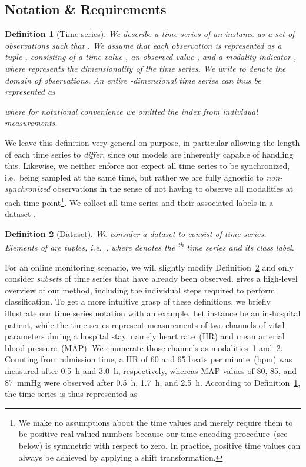 \documentclass{article}
\renewcommand{\th}{\textsuperscript{\textup{th}}\xspace}
\newtheorem{definition}{Definition}
\begin{document}
\subsection{Notation \& Requirements}


\begin{definition}[Time series]
  We describe a time series of an instance  as a set 
  of  observations
   such that .
We assume that each observation  is represented as a tuple
  , consisting of a time value ,
  an observed value ,
  and a modality indicator , where  represents the dimensionality
  of the time series.
We write 
  to denote the domain of observations.
An entire -dimensional time series can thus be represented as

where for notational convenience we omitted the index  from
  individual measurements.
\label{def:Time series}
\end{definition}
We leave this definition very general on purpose, in particular allowing
the length of each time series to \emph{differ}, since our models are
inherently capable of handling this.
Likewise, we neither enforce
nor expect all time series to be synchronized, i.e.\ being sampled at
the same time, but rather we are fully agnostic to \emph{non-synchronized}
observations in the sense of not having to observe all modalities at
each time point\footnote{We make no assumptions about the time values
 and merely require them to be positive real-valued numbers because
our time encoding procedure~(see below) is symmetric with respect to
zero. In practice, positive time values can always be achieved by
applying a shift transformation.}.
We collect all time series and their associated labels in a dataset
.
\begin{definition}[Dataset]
  We consider a dataset  to consist of  time series.
  Elements of  are tuples, i.e.\
  , where  denotes the \th time
  series and  its class label.
  \label{def:Dataset}
\end{definition}
For an online monitoring scenario, we will slightly modify
Definition~\ref{def:Dataset} and only consider \emph{subsets} of time
series that have already been observed.
 gives a high-level overview of our method,
including the individual steps required to perform classification.
To get a more intuitive grasp of these definitions, we briefly
illustrate our time
series notation with an example.
Let instance  be an in-hospital patient, while the time series
represent measurements of two channels of vital parameters during
a hospital stay, namely heart rate~(HR) and mean arterial blood
pressure~(MAP). We enumerate those channels as modalities~1 and~2.
Counting from admission time, a HR of 60 and 65 beats per minute~(bpm) was
measured after \SI{0.5}{\hour} and \SI{3.0}{\hour}, respectively,
whereas MAP values of 80, 85, and \SI{87}{\mmHg} were observed after
\SI{0.5}{\hour}, \SI{1.7}{\hour}, and \SI{2.5}{\hour}.
According to Definition~\ref{def:Time series}, the time series is thus
represented as
\end{document}
